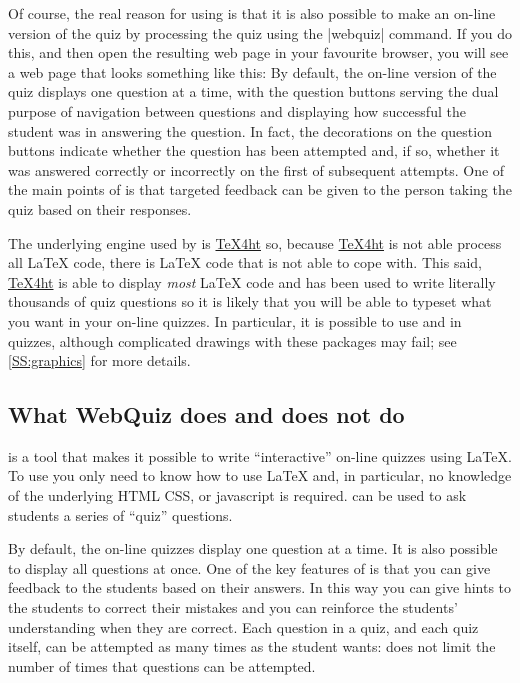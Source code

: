 \documentclass[svgnames]{article}
\newcommand\TeXfht{\href{https://www.ctan.org/tex4ht}{TeX4ht}\xspace}
\begin{document}
    Of course, the real reason for using \WebQuiz is that it is also
    possible to make an on-line version of the quiz by processing the
    quiz using the \BashCode|webquiz| command. If you do this, and then open
    the resulting web page in your favourite browser, you will see a web page
    that looks something like this:
    By default, the on-line version of the quiz displays one question at a time,
    with the question buttons serving the dual purpose of navigation
    between questions and displaying how successful the student was
    in answering the question. In fact, the decorations on the question
    buttons indicate whether the question has been attempted and, if so,
    whether it was answered correctly or incorrectly on the first of
    subsequent attempts. One of the main points of \WebQuiz is that
    targeted feedback can be given to the person taking the quiz based
    on their responses.

    The underlying engine used by \WebQuiz is \TeXfht so, because
    \TeXfht is not able process all \LaTeX{} code, there is \LaTeX{}
    code that \WebQuiz is not able to cope with.  This said, \TeXfht is
    able to display \textit{most} \LaTeX{} code and \WebQuiz has been
    used to write literally thousands of quiz questions so it is likely
    that you will be able to typeset what you want in your on-line
    quizzes.  In particular, it is possible to use  and
     in \WebQuiz quizzes, although complicated
    drawings with these packages may fail; see \autoref{SS:graphics} for
    more details.

    \newpage
\subsection{What WebQuiz does and does not do}

    \WebQuiz is a tool that makes it possible to write ``interactive''
    on-line quizzes using \LaTeX{}. To use \WebQuiz you only need to
    know how to use \LaTeX{} and, in particular, no knowledge of the
    underlying HTML CSS, or javascript is required. \WebQuiz can be used
    to ask students a series of ``quiz'' questions.

    By default, the on-line quizzes display one question at a time.  It
    is also possible to display all questions at once. One of the key
    features of \WebQuiz is that you can give feedback to the students
    based on their answers. In this way you can give hints to the
    students to correct their mistakes and you can reinforce the
    students' understanding when they are correct. Each question in a
    quiz, and each quiz itself, can be attempted as many times as the
    student wants: \WebQuiz does not limit the number of times that
    questions can be attempted.
\end{document}
